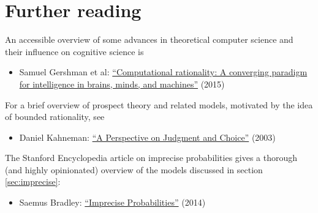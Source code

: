 \section{Further reading}

An accessible overview of some advances in theoretical computer science and their
influence on cognitive science is

\begin{itemize}
\item Samuel Gershman et al: \href{http://gershmanlab.webfactional.com/pubs/GershmanHorvitzTenenbaum15.pdf}{``Computational rationality: A converging paradigm for intelligence in brains, minds, and machines''} (2015)
\end{itemize}

For a brief overview of prospect theory and related models, motivated by
the idea of bounded rationality, see
%
\begin{itemize}
\item Daniel Kahneman: \href{http://www2.econ.iastate.edu/tesfatsi/JudgementAndChoice.MappingBoundedRationality.DKahneman2003.pdf}{``A Perspective on Judgment and Choice''} (2003)
\end{itemize}

The Stanford Encyclopedia article on imprecise probabilities gives a
thorough (and highly opinionated) overview of the models discussed in
section \ref{sec:imprecise}:

\begin{itemize}
\item Saemus Bradley: \href{https://plato.stanford.edu/entries/imprecise-probabilities/}{``Imprecise Probabilities''} (2014)
\end{itemize}

